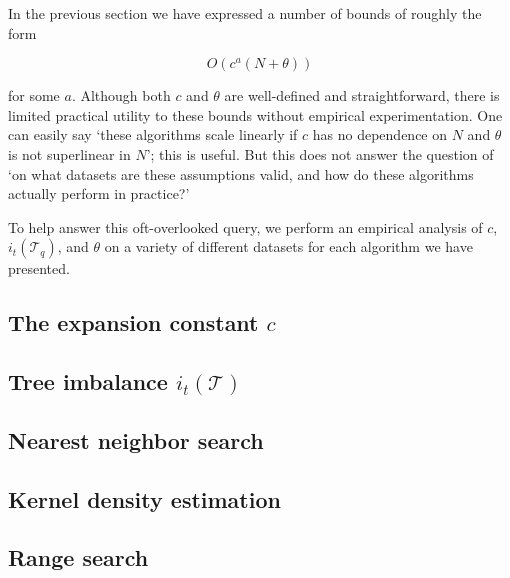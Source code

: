 In the previous section we have expressed a number of bounds of roughly the form

\begin{equation}
O(c^a (N + \theta))
\end{equation}

\noindent for some $a$.  Although both $c$ and $\theta$ are well-defined and
straightforward, there is limited practical utility to these bounds without
empirical experimentation.  One can easily say `these algorithms scale linearly
if $c$ has no dependence on $N$ and $\theta$ is not superlinear in $N$'; this is
useful.  But this does not answer the question of `on what datasets are these
assumptions valid, and how do these algorithms actually perform in practice?'

To help answer this oft-overlooked query, we perform an empirical analysis of
$c$, $i_t(\mathscr{T}_q)$, and $\theta$ on a variety of different datasets for
each algorithm we have presented.

\subsection{The expansion constant $c$}

\subsection{Tree imbalance $i_t(\mathscr{T})$}

\subsection{Nearest neighbor search}

\subsection{Kernel density estimation}

\subsection{Range search}
